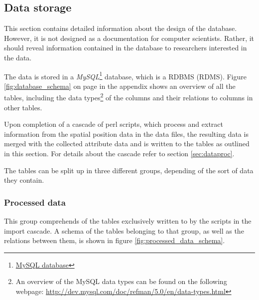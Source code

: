 \subsection{Data storage}
\label{subsec:datastorage}

This section contains detailed information about the design of the database. However, it is not designed as a documentation for computer scientists. Rather, it should reveal information contained in the database to researchers interested in the data.   

The data is stored in a \textit{MySQL}\footnote{\href{http://www.mysql.com/}{MySQL database}} database, which is  a \acf{RDBMS} (RDMS). Figure \ref{fig:database_schema} on page \pageref{fig:database_schema} in the appendix shows an overview of all the tables, including the data types\footnote{An overview of the MySQL data types can be found on the following webpage: \url{http://dev.mysql.com/doc/refman/5.0/en/data-types.html}} of the columns and their relations to columns in other tables.

Upon completion of a cascade of \ac{perl} scripts, which process and extract information from the spatial position data in the data files, the resulting data is merged with the collected attribute data and is written to the tables as outlined in this section. For details about the cascade refer to section \ref{sec:dataproc}. 

The tables can be split up in three different groups, depending of the sort of data they contain. 

\subsubsection{Processed data}
 
This group comprehends of the tables exclusively written to by the scripts in the import cascade. A schema of the tables belonging to that group, as well as the relations between them, is shown in figure \ref{fig:processed_data_schema}. 
 
